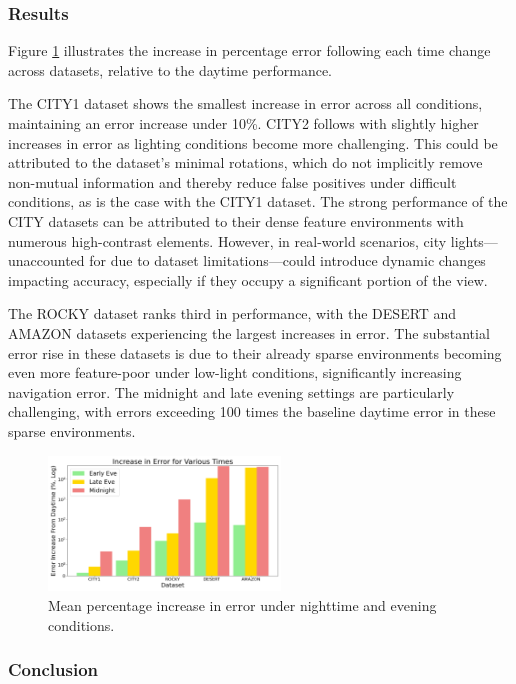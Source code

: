 \subsubsection{Results}


Figure \ref{fig:night_evening_rmse} illustrates the increase in percentage error following each time change across datasets, relative to the daytime performance. 

The CITY1 dataset shows the smallest increase in error across all conditions, maintaining an error increase under 10\%. CITY2 follows with slightly higher increases in error as lighting conditions become more challenging. This could be attributed to the dataset's minimal rotations, which do not implicitly remove non-mutual information and thereby reduce false positives under difficult conditions, as is the case with the CITY1 dataset. The strong performance of the CITY datasets can be attributed to their dense feature environments with numerous high-contrast elements. However, in real-world scenarios, city lights—unaccounted for due to dataset limitations—could introduce dynamic changes impacting accuracy, especially if they occupy a significant portion of the view.

The ROCKY dataset ranks third in performance, with the DESERT and AMAZON datasets experiencing the largest increases in error. The substantial error rise in these datasets is due to their already sparse environments becoming even more feature-poor under low-light conditions, significantly increasing navigation error. The midnight and late evening settings are particularly challenging, with errors exceeding 100 times the baseline daytime error in these sparse environments.


\begin{figure}[H]
    \centering
    \includegraphics[width=0.55\textwidth]{Chapter 5/RESULTPLOTS/lighting/lightresults.png}
    \caption{Mean percentage increase in error under nighttime and evening conditions.}
    \label{fig:night_evening_rmse}    
\end{figure}

\subsubsection{Conclusion}

